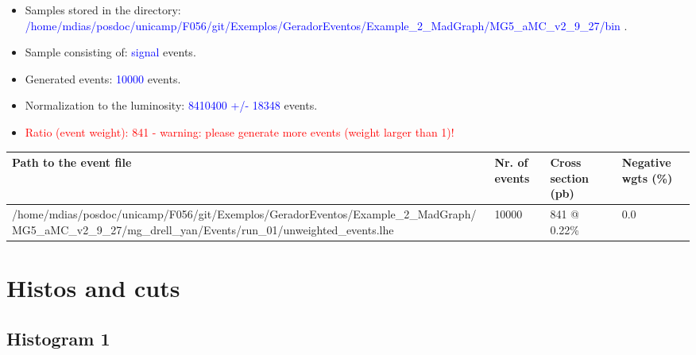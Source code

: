 \documentclass[a4paper, 10pt]{article}
\begin{document}
\begin{itemize}
  \item Samples stored in the directory: \textcolor{blue}{/\-home/\-mdias/\-posdoc/\-unicamp/\-F056/\-git/\-Exemplos/\-GeradorEventos/\-Example\_2\_MadGraph/\-MG5\_aMC\_v2\_9\_27/\-bin} .
   \item Sample consisting of: \textcolor{blue}{signal}  events.
   \item Generated events: \textcolor{blue}{10000 }  events.
   \item Normalization to the luminosity: \textcolor{blue}{8410400}\textcolor{blue}{ +/\-- }\textcolor{blue}{18348 }  events.
   \item\textcolor{red}{Ratio (event weight): }\textcolor{red}{841 }\textcolor{red}{ - warning: please generate more events (weight larger than 1)!}
\textcolor{red}{}
\end{itemize}
\begin{table}[H]
  \begin{center}
    \begin{tabular}{|m{55.0mm}|m{25.0mm}|m{30.0mm}|m{30.0mm}|}
      \hline
      {\cellcolor{yellow}         Path to the event file}& {\cellcolor{yellow}         Nr. of events}& {\cellcolor{yellow}         Cross section (pb)}& {\cellcolor{yellow}         Negative wgts (\%)}\\
      \hline
      {\cellcolor{white}          /\-home/\-mdias/\-posdoc/\-unicamp/\-F056/\-git/\-Exemplos/\-GeradorEventos/\-Example\_2\_MadGraph/\-MG5\_aMC\_v2\_9\_27/\-mg\_drell\_yan/\-Events/\-run\_01/\-unweighted\_events.lhe}& {\cellcolor{white}          10000}& {\cellcolor{white}          841 @ 0.22\%}& {\cellcolor{white}          0.0}\\
\hline
    \end{tabular}
  \end{center}
\end{table}

\newpage
\section{ Histos and cuts}

\subsection{ Histogram 1}
\end{document}
